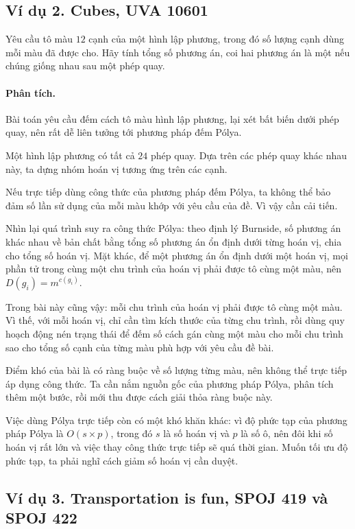 \documentclass[11pt]{article}
\begin{document}
\subsection{Ví dụ 2. Cubes, UVA 10601}

Yêu cầu tô màu \(12\) cạnh của một hình lập phương, trong đó số lượng cạnh
dùng mỗi màu đã được cho. Hãy tính tổng số phương án, coi hai phương án là
một nếu chúng giống nhau sau một phép quay.

\paragraph{Phân tích.}
Bài toán yêu cầu đếm cách tô màu hình lập phương, lại xét bất biến dưới phép
quay, nên rất dễ liên tưởng tới phương pháp đếm Pólya.

Một hình lập phương có tất cả \(24\) phép quay. Dựa trên các phép quay khác
nhau này, ta dựng nhóm hoán vị tương ứng trên các cạnh.

Nếu trực tiếp dùng công thức của phương pháp đếm Pólya, ta không thể bảo đảm
số lần sử dụng của mỗi màu khớp với yêu cầu của đề. Vì vậy cần cải tiến.

Nhìn lại quá trình suy ra công thức Pólya: theo định lý Burnside, số phương
án khác nhau về bản chất bằng tổng số phương án ổn định dưới từng hoán vị,
chia cho tổng số hoán vị. Mặt khác, để một phương án ổn định dưới một hoán
vị, mọi phần tử trong cùng một chu trình của hoán vị phải được tô cùng một
màu, nên \(D(g_i)=m^{c(g_i)}\).

Trong bài này cũng vậy: mỗi chu trình của hoán vị phải được tô cùng một màu.
Vì thế, với mỗi hoán vị, chỉ cần tìm kích thước của từng chu trình, rồi dùng
quy hoạch động nén trạng thái để đếm số cách gán cùng một màu cho mỗi chu
trình sao cho tổng số cạnh của từng màu phù hợp với yêu cầu đề bài.

Điểm khó của bài là có ràng buộc về số lượng từng màu, nên không thể trực
tiếp áp dụng công thức. Ta cần nắm nguồn gốc của phương pháp Pólya, phân tích
thêm một bước, rồi mới thu được cách giải thỏa ràng buộc này.

Việc dùng Pólya trực tiếp còn có một khó khăn khác: vì độ phức tạp của phương
pháp Pólya là \(O(s\times p)\), trong đó \(s\) là số hoán vị và \(p\) là số
ô, nên đôi khi số hoán vị rất lớn và việc thay công thức trực tiếp sẽ quá
thời gian. Muốn tối ưu độ phức tạp, ta phải nghĩ cách giảm số hoán vị cần
duyệt.

\subsection{Ví dụ 3. Transportation is fun, SPOJ 419 và SPOJ 422}
\end{document}
